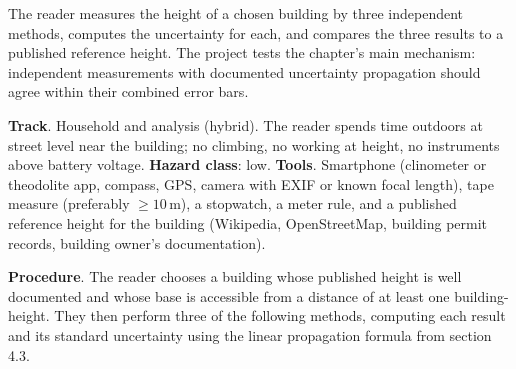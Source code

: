 \begin{project}
The reader measures the height of a chosen building by three
independent methods, computes the uncertainty for each, and
compares the three results to a published reference height. The
project tests the chapter's main mechanism: independent measurements
with documented uncertainty propagation should agree within their
combined error bars.

\textbf{Track}. Household and analysis (hybrid). The reader spends
time outdoors at street level near the building; no climbing, no
working at height, no instruments above battery voltage.
\textbf{Hazard class}: low.
\textbf{Tools}. Smartphone (clinometer or theodolite app, compass,
GPS, camera with EXIF or known focal length), tape measure
(preferably $\geq 10 \,\si{\meter}$), a stopwatch, a meter rule,
and a published reference height for the building (Wikipedia,
OpenStreetMap, building permit records, building owner's
documentation).

\textbf{Procedure}. The reader chooses a building whose published
height is well documented and whose base is accessible from a
distance of at least one building-height. They then perform three
of the following methods, computing each result and its standard
uncertainty using the linear propagation formula from section 4.3.


\end{project}
